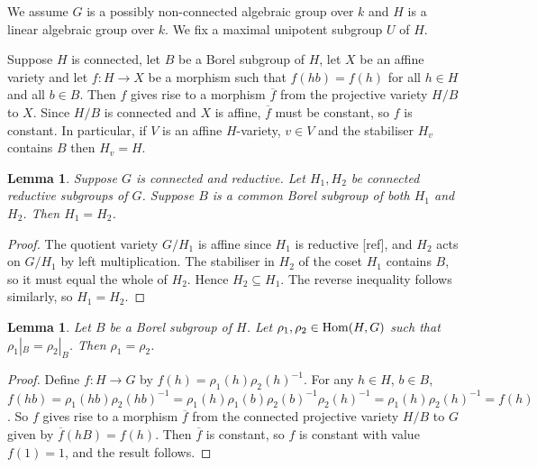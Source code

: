 \documentclass[12pt]{amsart}
\newcommand\ra{\rightarrow}
\numberwithin{equation}{section}
\newtheorem{lem}[equation]{Lemma}
\theoremstyle{definition}
\theoremstyle{remark}
\theoremstyle{remark}
\newcommand{\ovl}{\overline}
\begin{document}
\bigskip
We assume $G$ is a possibly non-connected algebraic group over $k$ and $H$ is a linear algebraic group over $k$.  We fix a maximal unipotent subgroup $U$ of $H$.


Suppose $H$ is connected, let $B$ be a Borel subgroup of $H$, let $X$ be an affine variety and let $f\colon H\ra X$ be a morphism such that $f(hb)= f(h)$ for all $h\in H$ and all $b\in B$.  Then $f$ gives rise to a morphism $\ovl{f}$ from the projective variety $H/B$ to $X$.  Since $H/B$ is connected and $X$ is affine, $\ovl{f}$ must be constant, so $f$ is constant.  In particular, if $V$ is an affine $H$-variety, $v\in V$ and the stabiliser $H_v$ contains $B$ then $H_v= H$.

\begin{lem}
\label{lem:common_Borel}
 Suppose $G$ is connected and reductive.  Let $H_1, H_2$ be connected reductive subgroups of $G$.  Suppose $B$ is a common Borel subgroup of both $H_1$ and $H_2$.  Then $H_1= H_2$.
\end{lem}

\begin{proof}
 The quotient variety $G/H_1$ is affine since $H_1$ is reductive [ref], and $H_2$ acts on $G/H_1$ by left multiplication.  The stabiliser in $H_2$ of the coset $H_1$ contains $B$, so it must equal the whole of $H_2$.  Hence $H_2\subseteq H_1$.  The reverse inequality follows similarly, so $H_1= H_2$.
\end{proof}

\begin{lem}
\label{lem:Borel_det}
 Let $B$ be a Borel subgroup of $H$.  Let $\rho_1,\rho_2\in {\rm Hom}(H,G)$ such that $\rho_1|_B= \rho_2|_B$.  Then $\rho_1= \rho_2$.
\end{lem}

\begin{proof}
 Define $f\colon H\ra G$ by $f(h)= \rho_1(h)\rho_2(h)^{-1}$.  For any $h\in H$, $b\in B$, $f(hb)= \rho_1(hb)\rho_2(hb)^{-1}= \rho_1(h)\rho_1(b)\rho_2(b)^{-1}\rho_2(h)^{-1}=  \rho_1(h)\rho_2(h)^{-1}= f(h)$.  So $f$ gives rise to a morphism $\ovl{f}$ from the connected projective variety $H/B$ to $G$ given by $\ovl{f}(hB)= f(h)$.  Then $\ovl{f}$ is constant, so $f$ is constant with value $f(1)= 1$, and the result follows.
\end{proof}
\end{document}

